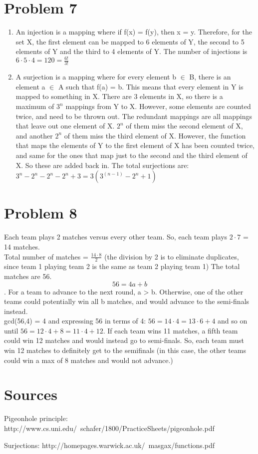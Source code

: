 \documentclass[english]{article}
\begin{document}
\section*{Problem 7}
\begin{enumerate} [label=\alph*]
\item An injection is a mapping where if f(x) = f(y), then x = y. Therefore, for the set X, the first element can be mapped to 6 elements of Y, the second to 5 elements of Y and the third to 4 elements of Y. The number of injections is $6 \cdot 5 \cdot 4 = 120 = \frac{6!}{3!}$
\item A surjection is a mapping where for every element b $\in$ B, there is an element a $\in$ A such that f(a) = b. This means that every element in Y is mapped to something in X. There are 3 elements in X, so there is a maximum of $3^n$ mappings from Y to X. However, some elements are counted twice, and need to be thrown out. The redundant mappings are all mappings that leave out one element of  X. $2^n$ of them miss the second element of X, and another $2^n$ of them miss the third element of X. However, the function that maps the elements of Y to the first element of X has been counted twice, and same for the ones that map just to the second and the third element of X. So these are added back in. The total surjections are: $3^n - 2^n - 2^n - 2^n + 3 = 3(3^(n-1) - 2^n + 1)$
\end{enumerate}
\section*{Problem 8}
Each team plays 2 matches versus every other team. So, each team plays $2 \cdot 7$ = 14 matches. 
\\ Total number of matches  = $\frac{14 \cdot 8}{2}$ (the division by 2 is to eliminate duplicates, since team 1 playing team 2 is the same as team 2 playing team 1) The total matches are 56.\\
$$ 56 = 4a + b$$.
For a team to advance to the next round, a > b. Otherwise, one of the other teams could potentially win all b matches, and would advance to the semi-finals instead.
\\ gcd(56,4) = 4 and expressing 56 in terms of 4: $56 = 14 \cdot 4 = 13 \cdot 6 + 4 $ and so on until $ 56 = 12 \cdot 4 + 8 = 11 \cdot 4 + 12$. If each team wins 11 matches, a fifth team could win 12 matches and would instead go to semi-finals. So, each team must win 12 matches to definitely get to the semifinals (in this case, the other teams could win a max of 8 matches and would not advance.)
\section*{Sources}
\item Pigeonhole principle: http://www.cs.uni.edu/~schafer/1800/PracticeSheets/pigeonhole.pdf
\item Surjections: http://homepages.warwick.ac.uk/~masgax/functions.pdf
\end{document}
